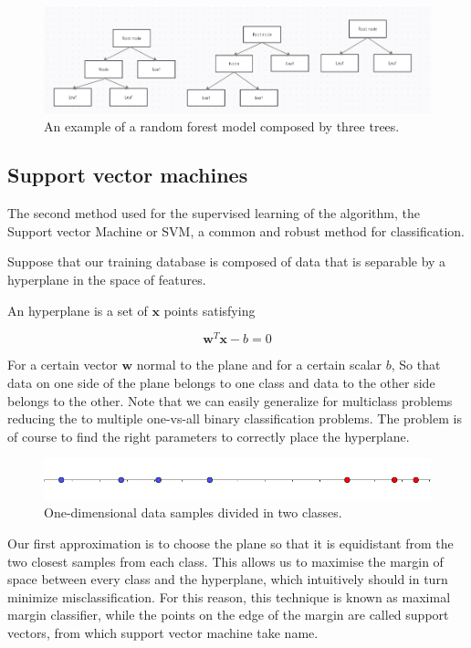 \documentclass[a4paper]{report}
\begin{document}
\begin{figure} [H]
\centering
\includegraphics [width=\textwidth ] {o/forest.png}
\caption{An example of a random forest model composed by three trees.}
\label{forest}
\end{figure}

\subsection{Support vector machines}

The second method used for the supervised learning of the algorithm, the Support vector Machine or SVM, a common and robust method for classification.

Suppose that our training database is composed of data that is separable by a hyperplane in the space of features.

An hyperplane is a set of $\textbf{x}$ points satisfying

\begin{equation}
    \textbf{w}^T\textbf{x} -b = 0
\end{equation}

For a certain vector $\textbf{w}$ normal to the plane and for a certain scalar $b$, So that data on one side of the plane belongs to one class and data to the other side belongs to the other.
Note that we can easily generalize for multiclass problems reducing the to multiple one-vs-all binary classification problems.
The problem is of course to find the right parameters to correctly place the hyperplane.

\begin{figure} [H]
    \centering
    \includegraphics [width=\textwidth ]{svm/1dim.png}
    \caption{One-dimensional data samples divided in two classes.}
    \label{1dim}
\end{figure}


Our first approximation is to choose the plane so that it is equidistant from the two closest samples from each class.
This allows us to maximise the margin of space between every class and the hyperplane, which intuitively should in turn minimize misclassification.
For this reason, this technique is known as maximal margin classifier, while the points on the edge of the margin are called support vectors, from which support vector machine take name.
\end{document}
